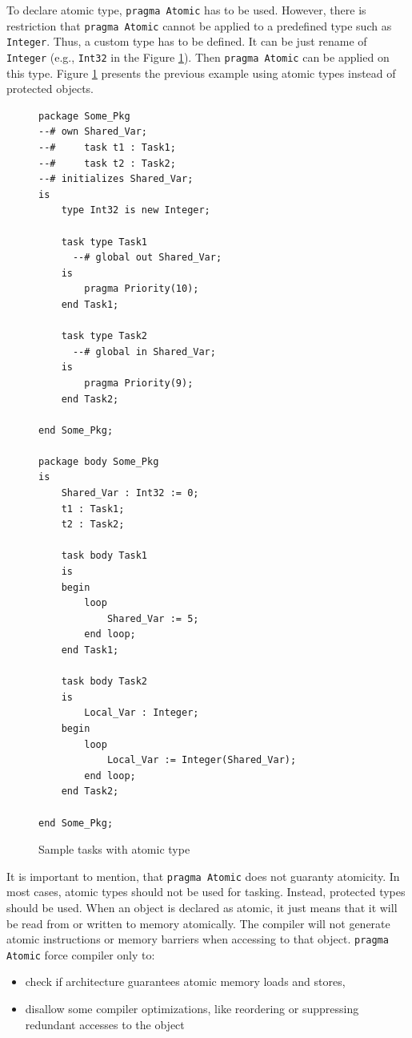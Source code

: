 To declare atomic type, \lstinline{pragma Atomic} has to be used. However, there is restriction that \lstinline{pragma Atomic} cannot be applied to a predefined type such as \lstinline{Integer}. Thus, a custom type has to be defined. It can be just rename of \lstinline{Integer} (e.g., \lstinline{Int32} in the Figure \ref{listing:SampleTasksWithAtomicType}). Then \lstinline{pragma Atomic} can be applied on this type. Figure \ref{listing:SampleTasksWithAtomicType} presents the previous example using atomic types instead of protected objects.

\begin{figure}
\singlespacing
\begin{lstlisting}[frame=single, gobble=0]
package Some_Pkg
--# own Shared_Var;
--#     task t1 : Task1;
--#     task t2 : Task2;
--# initializes Shared_Var;
is
    type Int32 is new Integer;
    
    task type Task1
      --# global out Shared_Var;
    is
        pragma Priority(10);
    end Task1;

    task type Task2
      --# global in Shared_Var;
    is
        pragma Priority(9);
    end Task2;

end Some_Pkg;

package body Some_Pkg
is    
    Shared_Var : Int32 := 0;
    t1 : Task1;
    t2 : Task2;

    task body Task1
    is
    begin
        loop
            Shared_Var := 5;
        end loop;
    end Task1;

    task body Task2
    is
        Local_Var : Integer;
    begin
        loop
            Local_Var := Integer(Shared_Var);
        end loop;
    end Task2;

end Some_Pkg;
\end{lstlisting}
\doublespacing
\caption{Sample tasks with atomic type}
\label{listing:SampleTasksWithAtomicType}
\end{figure}

It is important to mention, that \lstinline{pragma Atomic} does not guaranty atomicity. In most cases, atomic types should not be used for tasking. Instead, protected types should be used. When an object is declared as atomic, it just means that it will be read from or written to memory atomically. The compiler will not generate atomic instructions or memory barriers when accessing to that object. \lstinline{pragma Atomic} force compiler only to:
\begin{itemize}
	\item check if architecture guarantees atomic memory loads and stores,
	\item disallow some compiler optimizations, like reordering or suppressing redundant accesses to the object
\end{itemize}

